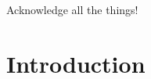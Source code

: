 \documentclass[12pt,msc,a4paper,oneside]{ucl_thesis}
\begin{document}
\begin{acknowledgements}
Acknowledge all the things!
\end{acknowledgements}

\setcounter{tocdepth}{2}

\tableofcontents
\listoffigures
\listoftables


\chapter{Introduction}
\label{sec:introduction}



 


\end{document}
